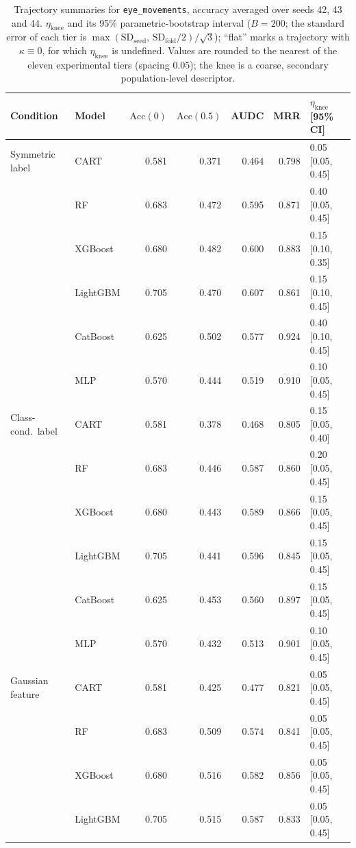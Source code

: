 \documentclass[pdflatex,sn-mathphys]{sn-jnl}
\theoremstyle{thmstyleone}
\begin{document}
\begin{table}[htbp]
\centering
\scriptsize
\setlength{\tabcolsep}{3.5pt}
\caption{Trajectory summaries for \texttt{eye\_movements}, accuracy averaged over seeds 42, 43 and 44. $\eta_{\mathrm{knee}}$ and its 95\% parametric-bootstrap interval ($B=200$; the standard error of each tier is $\max(\mathrm{SD}_{\mathrm{seed}},\,\mathrm{SD}_{\mathrm{fold}}/2)/\sqrt3$); ``flat'' marks a trajectory with $\kappa\equiv 0$, for which $\eta_{\mathrm{knee}}$ is undefined. Values are rounded to the nearest of the eleven experimental tiers (spacing $0.05$); the knee is a coarse, secondary population-level descriptor.}
\label{tab:traj_eye_movements}
\begin{tabular}{@{}llrrrrl@{}}
\toprule
Condition & Model & $\mathrm{Acc}(0)$ & $\mathrm{Acc}(0.5)$ & AUDC & MRR & $\eta_{\mathrm{knee}}$ [95\% CI] \\
\midrule
Symmetric label & CART & 0.581 & 0.371 & 0.464 & 0.798 & 0.05 [0.05, 0.45] \\
 & RF & 0.683 & 0.472 & 0.595 & 0.871 & 0.40 [0.05, 0.45] \\
 & XGBoost & 0.680 & 0.482 & 0.600 & 0.883 & 0.15 [0.10, 0.35] \\
 & LightGBM & 0.705 & 0.470 & 0.607 & 0.861 & 0.15 [0.10, 0.45] \\
 & CatBoost & 0.625 & 0.502 & 0.577 & 0.924 & 0.40 [0.10, 0.45] \\
 & MLP & 0.570 & 0.444 & 0.519 & 0.910 & 0.10 [0.05, 0.45] \\
\midrule
Class-cond.\ label & CART & 0.581 & 0.378 & 0.468 & 0.805 & 0.15 [0.05, 0.40] \\
 & RF & 0.683 & 0.446 & 0.587 & 0.860 & 0.20 [0.05, 0.45] \\
 & XGBoost & 0.680 & 0.443 & 0.589 & 0.866 & 0.15 [0.05, 0.45] \\
 & LightGBM & 0.705 & 0.441 & 0.596 & 0.845 & 0.15 [0.05, 0.45] \\
 & CatBoost & 0.625 & 0.453 & 0.560 & 0.897 & 0.15 [0.05, 0.45] \\
 & MLP & 0.570 & 0.432 & 0.513 & 0.901 & 0.10 [0.05, 0.45] \\
\midrule
Gaussian feature & CART & 0.581 & 0.425 & 0.477 & 0.821 & 0.05 [0.05, 0.45] \\
 & RF & 0.683 & 0.509 & 0.574 & 0.841 & 0.05 [0.05, 0.45] \\
 & XGBoost & 0.680 & 0.516 & 0.582 & 0.856 & 0.05 [0.05, 0.45] \\
 & LightGBM & 0.705 & 0.515 & 0.587 & 0.833 & 0.05 [0.05, 0.45] \\

\end{tabular}
\end{table}
\end{document}
